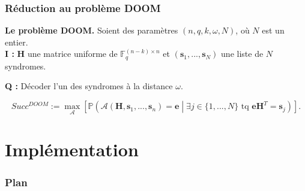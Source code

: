 \documentclass[10pt,a4paper]{beamer}
\theoremstyle{plain}
\theoremstyle{definition}
\newcommand{\F}{\mathbb{F}}
\begin{document}
\begin{frame}
\frametitle{Réduction au problème DOOM}

\begin{block}{}
\textbf{Le problème DOOM.} Soient des paramètres $(n,q,k,\omega,N)$, où $N$ est un entier. \\

\leftskip=1cm
\noindent \textbf{I :} $\mathbf{H}$ une matrice uniforme de $\F_q^{(n-k)\times n}$ et $(\mathbf{s}_1,...,\mathbf{s}_N)$ une liste de $N$ syndromes. 

\noindent \textbf{Q :} Décoder l'un des syndromes à la distance $\omega$. \\

\leftskip=0cm
\end{block}

\vspace{0.2in}
$$Succ^{DOOM} :=
 \max_{\mathcal{A}}\left[\mathbb{P}\left(\mathcal{A}(\mathbf{H},\mathbf{s}_1,...,\mathbf{s}_n)=\mathbf{e} \; \left| \; \exists  j \in \{1,...,N\} \text{ tq } \mathbf{eH}^T = \mathbf{s}_j\right)\right]\right..$$

\end{frame}




\section{Implémentation}

\begin{frame}
  \frametitle{Plan}
  \tableofcontents[currentsection,subsectionstyle=hide]
\end{frame}
\end{document}
